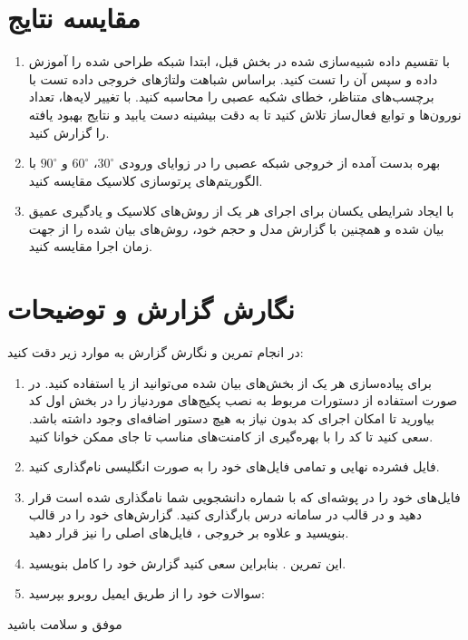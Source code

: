 \documentclass{utsignal}
\begin{document}
    \section{مقایسه نتایج}
    \begin{enumerate}
    	\item با تقسیم داده شبیه‌سازی شده در بخش قبل، ابتدا شبکه طراحی شده را آموزش داده و سپس آن را تست کنید. براساس شباهت ولتاژهای خروجی داده تست با برچسب‌های متناظر، خطای
    	شکبه عصبی را محاسبه کنید. با تغییر لایه‌ها، تعداد نورون‌ها و توابع فعال‌ساز تلاش کنید تا به دقت بیشینه دست یابید و نتایج بهبود یافته را گزارش کنید.
    	\item بهره بدست آمده از خروجی شبکه عصبی را در زوایای ورودی
    	$30^{\circ}$،
    	$60^{\circ}$
    	و
    	$90^{\circ}$
    	با الگوریتم‌های پرتوسازی کلاسیک مقایسه کنید.
    	\item با ایجاد شرایطی یکسان برای اجرای هر یک از روش‌های کلاسیک و یادگیری عمیق بیان شده و همچنین با گزارش مدل
    	و حجم
    	خود، روش‌های بیان شده را از جهت زمان اجرا مقایسه کنید.
    \end{enumerate}
    \section{نگارش گزارش و توضیحات}
    در انجام تمرین و نگارش گزارش به موارد زیر دقت کنید:
   	\begin{enumerate}
   		\item برای پیاده‌سازی هر یک از بخش‌های بیان شده می‌توانید از
   		یا
   		استفاده کنید. در صورت استفاده از
   		دستورات مربوط به نصب پکیج‌های موردنیاز را در بخش اول کد بیاورید تا امکان اجرای کد بدون نیاز به هیچ دستور اضافه‌ای وجود داشته باشد. سعی کنید تا کد را با بهره‌گیری از کامنت‌های مناسب تا جای ممکن خوانا کنید.
   		\item فایل فشرده نهایی و تمامی فایل‌های خود را به صورت انگلیسی نام‌گذاری کنید. 
   		\item  فایل‌‌های خود را در پوشه‌ای که با شماره دانشجویی شما نامگذاری شده‌ است قرار دهید و در قالب
   		در سامانه درس بارگذاری کنید. گزارش‌های خود را در قالب
   		بنویسید و علاوه بر خروجی
   		،
   		فایل‌های اصلی را نیز قرار دهید.
   		\item این تمرین
   		. بنابراین سعی‌ کنید گزارش خود را کامل بنویسید.
   		\item سوالات خود را از طریق ایمیل روبرو بپرسید:
   		\href{mailto:a.aghaei.s@gmail.com}{}
   	\end{enumerate}
  موفق و سلامت باشید
  
\end{document}
